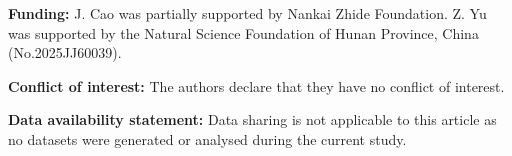 \documentclass[reqno,11pt,graphicx,]{amsart}
\numberwithin{equation}{section}
\theoremstyle{plain}
\newcommand{\3}{\mathbf{3}}
\begin{document}
	
	
	
	
	
	
	
	

	
	\smallskip
	
	\textbf{Funding:} J. Cao was partially supported by Nankai Zhide Foundation. Z. Yu was supported by the Natural Science Foundation of Hunan Province, China (No.2025JJ60039).
	
	\textbf{Conflict of interest:} The authors declare that they have no conflict of interest.
	
	\textbf{Data availability statement:} Data sharing is not applicable to this article as no datasets were generated or analysed during the current study.
	
%	
	
\end{document}
